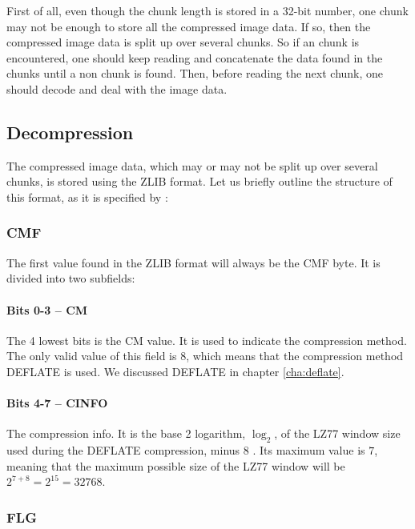 First of all, even though the chunk length is stored in a 32-bit
number, one chunk may not be enough to store all the compressed image
data. If so, then the compressed image data is split up over several
\IDAT chunks. So if an \IDAT chunk is encountered, one should keep
reading and concatenate the data found in the \IDAT chunks until a non
\IDAT chunk is found. Then, before reading the next chunk, one should
decode and deal with the image data.

\subsection{Decompression}
\label{sec:png-dec}

The compressed image data, which may or may not be split up over
several \IDAT chunks, is stored using the ZLIB format. Let us briefly
outline the structure of this format, as it is specified by
\cite{gailly96:_zlib_compr_data_format_specif}:

\subsubsection{CMF}

The first value found in the ZLIB format will always be the CMF
byte. It is divided into two subfields:

\paragraph{Bits 0-3 -- CM}

The 4 lowest bits is the CM value. It is used to indicate the
compression method. The only valid value of this field is $8$, which
means that the compression method DEFLATE is used. We discussed
DEFLATE in chapter \ref{cha:deflate}.

\paragraph{Bits 4-7 -- CINFO}

The compression info. It is the base 2 logarithm, $\log_2$, of the
LZ77 window size used during the DEFLATE compression, minus $8$ . Its
maximum value is $7$, meaning that the maximum possible size of the LZ77 window
will be $2^{7 + 8} = 2^{15} = 32768$.

\subsubsection{FLG}

